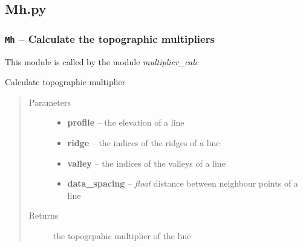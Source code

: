 \documentclass[letterpaper,10pt,english]{sphinxmanual}
\begin{document}
\subsection{Mh.py}
\label{docs/topographic:mh-py}\label{docs/topographic:module-Mh}

\subsubsection{\texttt{Mh} -- Calculate the topographic multipliers}
\label{docs/topographic:mh-calculate-the-topographic-multipliers}
This module is called by the module \emph{multiplier\_calc}


\begin{fulllineitems}
\label{docs/topographic:Mh.Mh}
Calculate topographic multiplier
\begin{quote}\begin{description}
\item[{Parameters}] \leavevmode\begin{itemize}
\item {} 
\textbf{profile} --  the elevation of a line

\item {} 
\textbf{ridge} --  the indices of the ridges of a line

\item {} 
\textbf{valley} --  the indices of the valleys of a line

\item {} 
\textbf{data\_spacing} -- \emph{float} distance between neighbour points of a line

\end{itemize}

\item[{Returns}] \leavevmode
{} the topogrpahic multiplier of the line

\end{description}\end{quote}

\end{fulllineitems}


\end{document}
